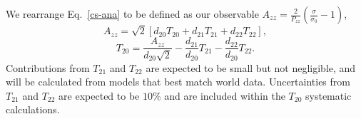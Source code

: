 
We rearrange Eq.~\ref{cs-ana} to be defined as our observable $A_{zz} = \frac{2}{P_{zz}}\left( \frac{\sigma}{\sigma_0} - 1 \right)$,
\begin{equation}A_{zz} = \sqrt{2} \left[ d_{20} T_{20} + d_{21} T_{21} + d_{22} T_{22}\right],
\end{equation}
\begin{equation}
T_{20} = \frac{A_{zz}}{d_{20}\sqrt{2}}-\frac{d_{21}}{d_{20}}T_{21}-\frac{d_{22}}{d_{20}}T_{22}.
\end{equation}
Contributions from $T_{21}$ and $T_{22}$ are expected to be small but not negligible, and will be calculated from models that best match world data. Uncertainties from $T_{21}$ and $T_{22}$ are expected to be $10\%$ and are included within the $T_{20}$ systematic calculations.


